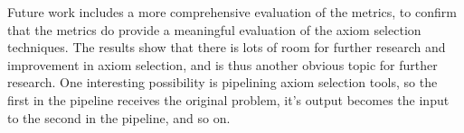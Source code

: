 \documentclass[EPiC]{easychair}
\begin{document}
Future work includes a more comprehensive evaluation of the metrics, to
confirm that the metrics do provide a meaningful evaluation of the axiom
selection techniques.
The results show that there is lots of room for further research and 
improvement in axiom selection, and is thus another obvious topic for
further research.
One interesting possibility is pipelining axiom selection tools, so
the first in the pipeline receives the original problem, it's output
becomes the input to the second in the pipeline, and so on.

\label{sect:bib}


\end{document}
